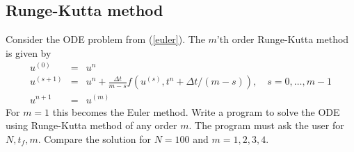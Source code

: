 \documentclass[11pt,oneside]{amsart}
\begin{document}
\subsection{Runge-Kutta method}

Consider the ODE problem from (\ref{euler}). The $m$'th order Runge-Kutta method is given by
\begin{eqnarray*}
u^{(0)} &=& u^n \\
u^{(s+1)} &=& u^n + \frac{\Delta t}{m-s} f(u^{(s)}, t^n+\Delta t/(m-s)), \quad s=0,\ldots,m-1\\
u^{n+1} &=& u^{(m)}
\end{eqnarray*}
For $m=1$ this becomes the Euler method. Write a program to solve the ODE using Runge-Kutta method of any order $m$. The program must ask the user for $N, t_f, m$. Compare the solution for $N=100$ and $m=1,2,3,4$.

\end{document}
